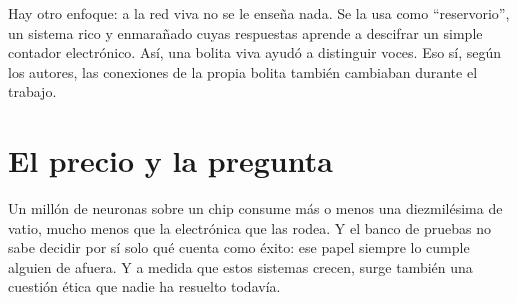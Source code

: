 Hay otro enfoque: a la red viva no se le enseña nada. Se la usa como “reservorio”, un sistema rico y enmarañado cuyas respuestas aprende a descifrar un simple contador electrónico. Así, una bolita viva ayudó a distinguir voces. Eso sí, según los autores, las conexiones de la propia bolita también cambiaban durante el trabajo.

\section*{El precio y la pregunta}

Un millón de neuronas sobre un chip consume más o menos una diezmilésima de vatio, mucho menos que la electrónica que las rodea. Y el banco de pruebas no sabe decidir por sí solo qué cuenta como éxito: ese papel siempre lo cumple alguien de afuera. Y a medida que estos sistemas crecen, surge también una cuestión ética que nadie ha resuelto todavía.

